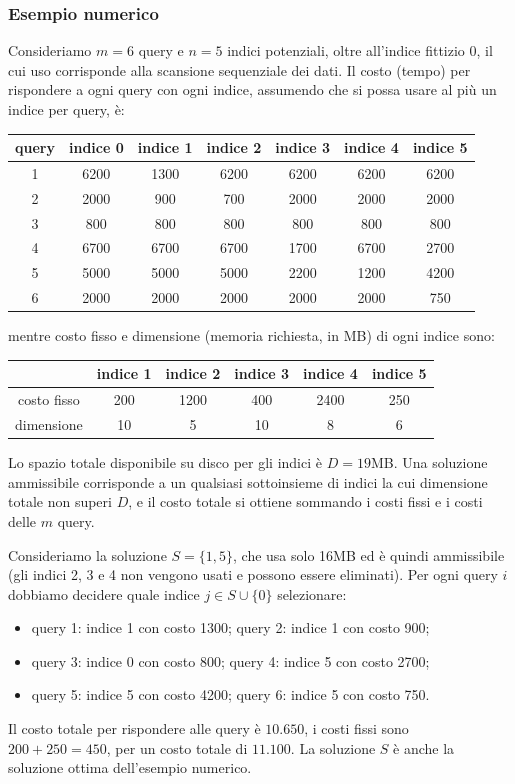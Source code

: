 \subsubsection*{Esempio numerico}
Consideriamo $m=6$ query e $n=5$ indici potenziali, oltre all'indice fittizio 0, il cui uso corrisponde alla scansione sequenziale dei dati. Il costo (tempo) per rispondere a ogni query con ogni indice, assumendo che si possa usare al più un indice per query, è:
\begin{center}
	\footnotesize
	\begin{tabular}{c|cccccc}
		query & indice 0 & indice 1 & indice 2 & indice 3 & indice 4 & indice 5\\
		\hline
		1 & 6200 & 1300 & 6200 & 6200 & 6200 & 6200\\
		2 & 2000 & 900 & 700 & 2000 & 2000 & 2000\\
		3 & 800 & 800 & 800 & 800 & 800 & 800\\
		4 & 6700 & 6700 & 6700 & 1700 & 6700 & 2700\\
		5 & 5000 & 5000 & 5000 & 2200 & 1200 & 4200\\
		6 & 2000 & 2000 & 2000 & 2000 & 2000 & 750
	\end{tabular}
\end{center}
mentre costo fisso e dimensione (memoria richiesta, in MB) di ogni indice sono:
\begin{center}
	\footnotesize
	\begin{tabular}{c|ccccc}
		& indice 1 & indice 2 & indice 3 & indice 4 & indice 5\\
		\hline
		costo fisso & 200 & 1200 & 400 & 2400 & 250\\
		dimensione & 10 & 5 & 10 & 8 & 6
	\end{tabular}
\end{center}
Lo spazio totale disponibile su disco per gli indici è $D=19$MB. Una soluzione ammissibile corrisponde a un qualsiasi sottoinsieme di indici la cui dimensione totale non superi $D$, e il costo totale si ottiene sommando i costi fissi e i costi delle $m$ query.

Consideriamo la soluzione $S=\{1,5\}$, che usa solo 16MB ed è quindi ammissibile (gli indici 2, 3 e 4 non vengono usati e possono essere eliminati). Per ogni query $i$ dobbiamo decidere quale indice $j\in S\cup \{0\}$ selezionare:
\begin{itemize}
	\item query 1: indice 1 con costo 1300; query 2: indice 1 con costo 900;
	\item query 3: indice 0 con costo 800; query 4: indice 5 con costo 2700;
	\item query 5: indice 5 con costo 4200; query 6: indice 5 con costo 750.
\end{itemize}
Il costo totale per rispondere alle query è $10.650$, i costi fissi sono $200+250=450$, per un costo totale di $\mathbf{11.100}$. La soluzione $S$ è anche la soluzione ottima dell'esempio numerico.


